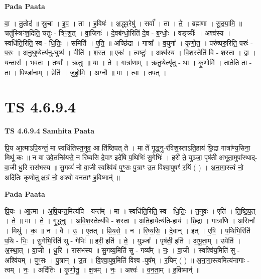 \documentclass[17pt]{extarticle}
\begin{document}
\textbf{Pada Paata} \newline

वा॒ । तु॒तोद॑ ॥ स्रु॒चा । इ॒व॒ । ता । ह॒विषः॑ । अ॒द्ध्व॒रेषु॑ । सर्वा᳚ । ता । ते॒ । ब्रह्म॑णा । सू॒द॒या॒मि॒ ॥ चतु॑स्त्रिꣳश॒दिति॒ चतुः॑ - त्रिꣳ॒॒श॒त् । वा॒जिनः॑ । दे॒वब॑न्धो॒रिति॑ दे॒व - ब॒न्धोः॒ । वङ्क्रीः᳚ । अश्व॑स्य । स्वधि॑ति॒रिति॒ स्व - धि॒तिः॒ । समिति॑ । ए॒ति॒ ॥ अच्छि॑द्रा । गात्रा᳚ । व॒युना᳚ । कृ॒णो॒त॒ । परु॑ष्परु॒रिति॒ परुः॑ - प॒रुः॒ । अ॒नु॒घुष्येत्य॑नु-घुष्य॑ । वीति॑ । श॒स्त॒ ॥ एकः॑ । त्वष्टुः॑ । अश्व॑स्य । वि॒श॒स्तेति॑ वि - श॒स्ता । द्वा । य॒न्तारा᳚ । भ॒व॒तः॒ । तथा᳚ । ऋ॒तुः ॥ या । ते॒ । गात्रा॑णाम् । ऋ॒तु॒थेत्यृ॑तु - था । कृ॒णोमि॑ । तातेति॒ ता - ता॒ । पिण्डा॑नाम् । प्रेति॑ । जु॒हो॒मि॒ । अ॒ग्नौ ॥ मा । त्वा॒ । त॒प॒त् ।  \newline





\section{ TS 4.6.9.4 }

\textbf{TS 4.6.9.4 } \newline
\textbf{Samhita Paata} \newline

प्रि॒य आ॒त्माऽपि॒यन्तं॒ मा स्वधि॑तिस्त॒नुव॒ आ ति॑ष्ठिपत् ते । मा ते॑ गृ॒द्ध्नु-र॑विश॒स्ताऽति॒हाय॑ छि॒द्रा गात्रा᳚ण्य॒सिना॒ मिथू॑ कः ॥ न वा उ॑वे॒तन्म्रि॑यसे॒ न रि॑ष्यसि दे॒वाꣳ इदे॑षि प॒थिभिः॑ सु॒गेभिः॑ । हरी॑ ते॒ युञ्जा॒ पृष॑ती अभूता॒मुपा᳚स्थाद्-वा॒जी धु॒रि रास॑भस्य ॥ सु॒गव्यं॑ नो वा॒जी स्वश्वि॑यं पुꣳ॒॒सः पु॒त्राꣳ उ॒त वि॑श्वा॒पुषꣳ॑ र॒यिं ( ) । अ॒ना॒गा॒स्त्वं नो॒ अदि॑तिः कृणोतु क्ष॒त्रं नो॒ अश्वो॑ वनताꣳ ह॒विष्मान्॑ ॥ \newline

\textbf{Pada Paata} \newline

प्रि॒यः । आ॒त्मा । अ॒पि॒यन्त॒मित्य॑पि - यन्त᳚म् । मा । स्वधि॑ति॒रिति॒ स्व - धि॒तिः॒ । त॒नुवः॑ । एति॑ । ति॒ष्ठि॒प॒त् । ते॒ ॥ मा । ते॒ । गृ॒द्ध्नुः । अ॒वि॒श॒स्तेत्य॑वि - श॒स्ता । अ॒ति॒हायेत्य॑ति-हाय॑ । छि॒द्रा । गात्रा॑णि । अ॒सिना᳚ । मिथु॑ । कः॒ ॥ न । वै । उ॒ । ए॒तत् । म्रि॒य॒से॒ । न । रि॒ष्य॒सि॒ । दे॒वान् । इत् । ए॒षि॒ । प॒थिभि॒रिति॑ प॒थि - भिः॒ । सु॒गेभि॒रिति॑ सु - गेभिः॑ ॥ हरी॒ इति॑ । ते॒ । युञ्जा᳚ । पृष॑ती॒ इति॑ । अ॒भू॒ता॒म् । उपेति॑ । अ॒स्था॒त् । वा॒जी । धु॒रि । रास॑भस्य ॥ सु॒गव्य॒मिति॑ सु - गव्य᳚म् । नः॒ । वा॒जी । स्वश्वि॑य॒मिति॑ सु - अश्वि॑यम् । पुꣳ॒॒सः । पु॒त्रान् । उ॒त । वि॒श्वा॒पुष॒मिति॑ विश्व -पुष᳚म् । र॒यिम् ( ) ॥ अ॒ना॒गा॒स्त्वमित्य॑नागाः - त्वम् । नः॒ । अदि॑तिः । कृ॒णो॒तु॒ । क्ष॒त्रम् । नः॒ । अश्वः॑ । व॒न॒ता॒म् । ह॒विष्मान्॑ ॥  \newline
\end{document}
